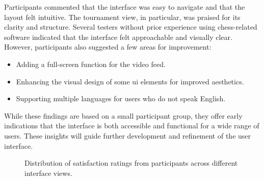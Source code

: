 Participants commented that the interface was easy to navigate and that the layout felt intuitive. The tournament view, in particular, was praised for its clarity and structure. Several testers without prior experience using chess-related software indicated that the interface felt approachable and visually clear. \\

However, participants also suggested a few areas for improvement:

\begin{itemize}
    \item Adding a full-screen function for the video feed.
    \item Enhancing the visual design of some \gls{ui} elements for improved aesthetics.
    \item Supporting multiple languages for users who do not speak English.
\end{itemize}

While these findings are based on a small participant group, they offer early indications that the interface is both accessible and functional for a wide range of users. These insights will guide further development and refinement of the user interface.

\begin{figure}[h!]
\centering
{}
\caption[Satisfaction rating distribution]{Distribution of satisfaction ratings from participants across different interface views.}
\label{fig:wireframe-test-results}
\end{figure}



